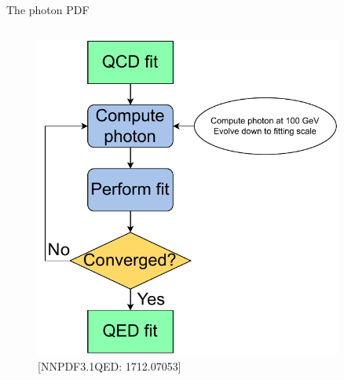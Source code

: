 \documentclass[8pt,t]{beamer}
\begin{document}
\begin{frame}{The photon PDF}
\begin{columns}
    \begin{column}{0.39\textwidth}
      \vspace*{-1.5em}
      \begin{figure}
        \includegraphics[width=0.9\textwidth]{figures/luxqed_iteration.pdf}
        \caption*{\color{gray}\footnotesize [NNPDF3.1QED: 1712.07053]}
      \end{figure}
    \end{column}
  \end{columns}

\end{frame}
\end{document}
